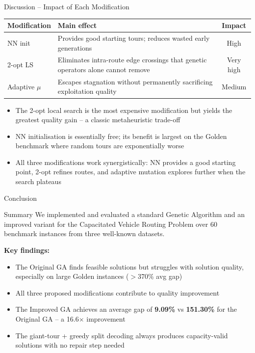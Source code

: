 \documentclass{beamer}
\begin{document}
\begin{frame}{Discussion -- Impact of Each Modification}
  \begin{center}
  \begin{tabular}{lp{6.5cm}c}
    \toprule
    Modification & Main effect & Impact \\
    \midrule
    NN init       & Provides good starting tours; reduces wasted
                    early generations                              & High \\[4pt]
    2-opt LS      & Eliminates intra-route edge crossings that
                    genetic operators alone cannot remove          & Very high \\[4pt]
    Adaptive $\mu$ & Escapes stagnation without permanently
                    sacrificing exploitation quality               & Medium \\
    \bottomrule
  \end{tabular}
  \end{center}

  \vspace{6pt}
  \begin{itemize}
    \item The 2-opt local search is the most expensive modification but
          yields the greatest quality gain -- a classic metaheuristic trade-off
    \item NN initialisation is essentially free; its benefit is largest on
          the Golden benchmark where random tours are exponentially worse
    \item All three modifications work synergistically: NN provides a
          good starting point, 2-opt refines routes, and adaptive mutation
          explores further when the search plateaus
  \end{itemize}
\end{frame}

\begin{frame}{Conclusion}
  \begin{block}{Summary}
    We implemented and evaluated a standard Genetic Algorithm and an
    improved variant for the Capacitated Vehicle Routing Problem over
    60 benchmark instances from three well-known datasets.
  \end{block}

  \vspace{6pt}
  \textbf{Key findings:}
  \begin{itemize}
    \item The Original GA finds feasible solutions but struggles with solution
          quality, especially on large Golden instances ($>$370\% avg gap)
    \item All three proposed modifications contribute to quality improvement
    \item The Improved GA achieves an average gap of \textbf{9.09\%} vs
          \textbf{151.30\%} for the Original GA -- a 16.6$\times$ improvement
    \item The giant-tour + greedy split decoding always produces
          capacity-valid solutions with no repair step needed
  \end{itemize}
\end{frame}
\end{document}
